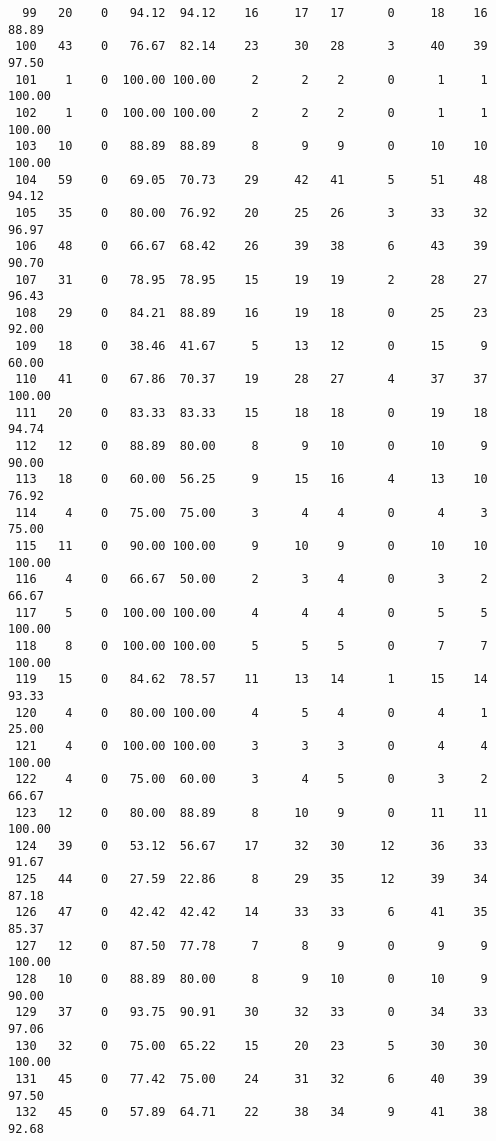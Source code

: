 \begin{verbatim}
  99   20    0   94.12  94.12    16     17   17      0     18    16    88.89
 100   43    0   76.67  82.14    23     30   28      3     40    39    97.50
 101    1    0  100.00 100.00     2      2    2      0      1     1   100.00
 102    1    0  100.00 100.00     2      2    2      0      1     1   100.00
 103   10    0   88.89  88.89     8      9    9      0     10    10   100.00
 104   59    0   69.05  70.73    29     42   41      5     51    48    94.12
 105   35    0   80.00  76.92    20     25   26      3     33    32    96.97
 106   48    0   66.67  68.42    26     39   38      6     43    39    90.70
 107   31    0   78.95  78.95    15     19   19      2     28    27    96.43
 108   29    0   84.21  88.89    16     19   18      0     25    23    92.00
 109   18    0   38.46  41.67     5     13   12      0     15     9    60.00
 110   41    0   67.86  70.37    19     28   27      4     37    37   100.00
 111   20    0   83.33  83.33    15     18   18      0     19    18    94.74
 112   12    0   88.89  80.00     8      9   10      0     10     9    90.00
 113   18    0   60.00  56.25     9     15   16      4     13    10    76.92
 114    4    0   75.00  75.00     3      4    4      0      4     3    75.00
 115   11    0   90.00 100.00     9     10    9      0     10    10   100.00
 116    4    0   66.67  50.00     2      3    4      0      3     2    66.67
 117    5    0  100.00 100.00     4      4    4      0      5     5   100.00
 118    8    0  100.00 100.00     5      5    5      0      7     7   100.00
 119   15    0   84.62  78.57    11     13   14      1     15    14    93.33
 120    4    0   80.00 100.00     4      5    4      0      4     1    25.00
 121    4    0  100.00 100.00     3      3    3      0      4     4   100.00
 122    4    0   75.00  60.00     3      4    5      0      3     2    66.67
 123   12    0   80.00  88.89     8     10    9      0     11    11   100.00
 124   39    0   53.12  56.67    17     32   30     12     36    33    91.67
 125   44    0   27.59  22.86     8     29   35     12     39    34    87.18
 126   47    0   42.42  42.42    14     33   33      6     41    35    85.37
 127   12    0   87.50  77.78     7      8    9      0      9     9   100.00
 128   10    0   88.89  80.00     8      9   10      0     10     9    90.00
 129   37    0   93.75  90.91    30     32   33      0     34    33    97.06
 130   32    0   75.00  65.22    15     20   23      5     30    30   100.00
 131   45    0   77.42  75.00    24     31   32      6     40    39    97.50
 132   45    0   57.89  64.71    22     38   34      9     41    38    92.68

\end{verbatim}
